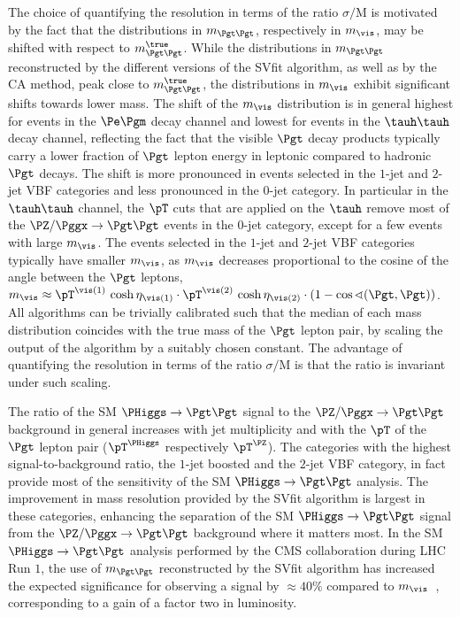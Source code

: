 The choice of quantifying the resolution in terms of the ratio $\sigma/\textrm{M}$ is motivated 
by the fact that the distributions in $m_{\Pgt\Pgt}$, respectively in $m_{\vis}$, may be shifted with respect to $m_{\Pgt\Pgt}^{\true}$.
While the distributions in $m_{\Pgt\Pgt}$ reconstructed by the different versions of the SVfit algorithm,
as well as by the CA method, peak close to $m_{\Pgt\Pgt}^{\true}$,
the distributions in $m_{\vis}$ exhibit significant shifts towards lower mass.
The shift of the $m_{\vis}$ distribution is in general highest for events in the $\Pe\Pgm$ decay channel and lowest for events in the $\tauh\tauh$ decay channel,
reflecting the fact that the visible $\Pgt$ decay products typically carry a lower fraction of $\Pgt$ lepton energy in leptonic compared to hadronic $\Pgt$ decays.
The shift is more pronounced in events selected in the $1$-jet and $2$-jet VBF categories and less pronounced in the $0$-jet category.
In particular in the $\tauh\tauh$ channel,
the $\pT$ cuts that are applied on the $\tauh$ remove most of the $\PZ/\Pggx \to \Pgt\Pgt$ events in the $0$-jet category,
except for a few events with large $m_{\vis}$.
The events selected in the $1$-jet and $2$-jet VBF categories typically have smaller $m_{\vis}$, as $m_{\vis}$ decreases proportional to the cosine of the angle between the $\Pgt$ leptons,
$m_{\vis} \approx \pT^{\vis(1)} \, \cosh\eta_{\vis(1)} \cdot \pT^{\vis(2)} \, \cosh\eta_{\vis(2)} \cdot \left( 1 - \cos\sphericalangle(\Pgt,\Pgt) \right)$.
All algorithms can be trivially calibrated such that the median of each mass distribution coincides with the true mass of the $\Pgt$ lepton pair,
by scaling the output of the algorithm by a suitably chosen constant.
The advantage of quantifying the resolution in terms of the ratio $\sigma/\textrm{M}$ is that the ratio
is invariant under such scaling.

The ratio of the SM $\PHiggs \to \Pgt\Pgt$ signal to the $\PZ/\Pggx \to \Pgt\Pgt$ background in general increases with jet multiplicity
and with the $\pT$ of the $\Pgt$ lepton pair ($\pT^{\PHiggs}$ respectively $\pT^{\PZ}$).
The categories with the highest signal-to-background ratio, the $1$-jet boosted and the $2$-jet VBF category,
in fact provide most of the sensitivity of the SM $\PHiggs \to \Pgt\Pgt$ analysis.
The improvement in mass resolution provided by the SVfit algorithm is largest in these categories,
enhancing the separation of the SM $\PHiggs \to \Pgt\Pgt$ signal from the $\PZ/\Pggx \to \Pgt\Pgt$ background where it matters most.
In the SM $\PHiggs \to \Pgt\Pgt$ analysis performed by the CMS collaboration during LHC Run $1$,
the use of $m_{\Pgt\Pgt}$ reconstructed by the SVfit algorithm has increased the expected significance for observing a signal by $\approx 40\%$ compared to $m_{\vis}$~\cite{HIG-13-004},
corresponding to a gain of a factor two in luminosity.

